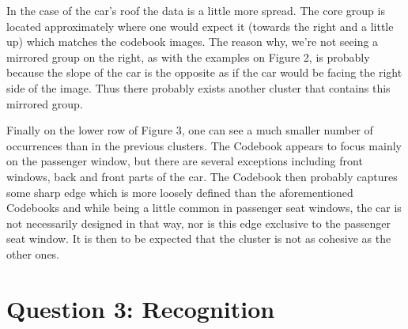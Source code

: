 \documentclass[12pt]{article}
\begin{document}
	
	In the case of the car's roof the data is a little more spread. The core group is located approximately where one would expect it (towards the right and a little up) which matches the codebook images. The reason why, we're not seeing a mirrored group on the  right, as with the examples on Figure 2, is probably because the slope of the car is the opposite as if the car would be facing the right side of the image. Thus there probably exists another cluster that contains this mirrored group.
	
	Finally on the lower row of Figure 3, one can see a much smaller number of occurrences than in the previous clusters. The Codebook appears to focus mainly on the passenger window, but there are several exceptions including front windows, back and front parts of the car. The Codebook then probably captures some sharp edge which is more loosely defined than the aforementioned Codebooks and while being a little common in passenger seat windows, the car is not necessarily designed in that way, nor is this edge exclusive to the passenger seat window. It is then to be expected that the cluster is not as cohesive as the other ones.


\newpage
\section*{Question 3: Recognition}
\end{document}
